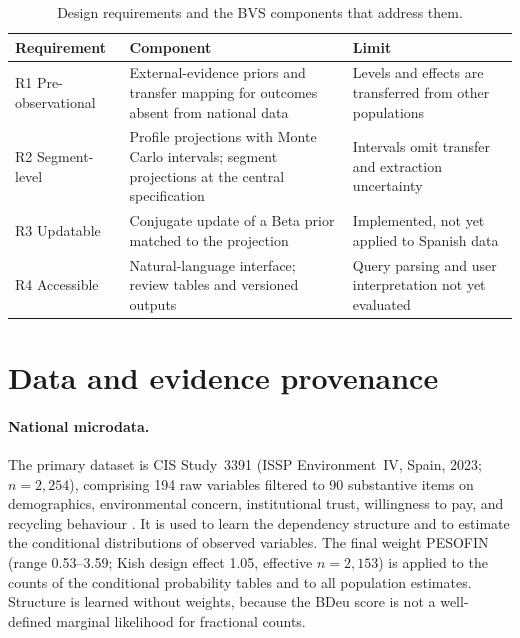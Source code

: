 \begin{table}[htbp]
\centering
\caption{Design requirements and the BVS components that address them.}
\label{tab:requirements}
\small
\begin{tabularx}{\textwidth}{lXX}
\toprule
\textbf{Requirement} & \textbf{Component} & \textbf{Limit} \\
\midrule
R1 Pre-observational & External-evidence priors and transfer mapping for
  outcomes absent from national data & Levels and effects are transferred from
  other populations \\
R2 Segment-level & Profile projections with Monte Carlo intervals; segment
  projections at the central specification & Intervals omit transfer and
  extraction uncertainty \\
R3 Updatable & Conjugate update of a Beta prior matched to the projection &
  Implemented, not yet applied to Spanish data \\
R4 Accessible & Natural-language interface; review tables and versioned
  outputs & Query parsing and user interpretation not yet evaluated \\
\bottomrule
\end{tabularx}
\end{table}

\section{Data and evidence provenance}
\label{sec:data}

\paragraph{National microdata.}
The primary dataset is CIS Study~3391 (ISSP Environment~IV, Spain, 2023;
$n = 2{,}254$), comprising 194 raw variables filtered to 90 substantive items on
demographics, environmental concern, institutional trust, willingness to pay,
and recycling behaviour \citep{cis2023}. It is used to learn the dependency
structure and to estimate the conditional distributions of observed variables.
The final weight PESOFIN (range 0.53--3.59; Kish design effect 1.05,
effective $n = 2{,}153$) is applied to the counts of the conditional
probability tables and to all population estimates. Structure is learned
without weights, because the BDeu score is not a well-defined marginal
likelihood for fractional counts.

